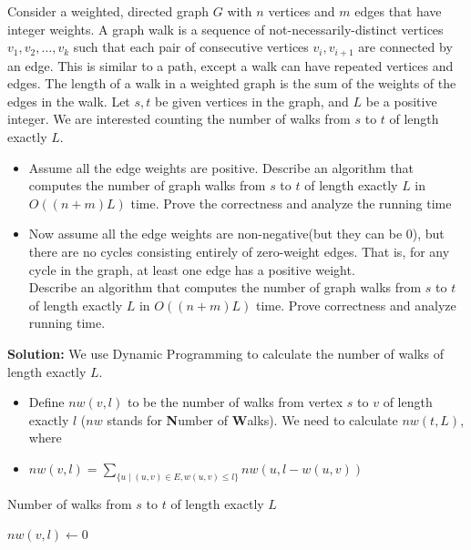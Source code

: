 \documentclass{article}
\newcounter{exercise}
\newcommand{\<}{
    \langle}
\renewcommand{\>}{
    \rangle}
\begin{document}
{\begin{exercise}
Consider a weighted, directed graph $G$ with $n$ vertices and $m$ edges that have integer weights. A graph walk is a sequence of
not-necessarily-distinct vertices $v_1,v_2,\ldots,v_k$ such that each pair of consecutive vertices $v_i,v_{i+1}$ are connected by an edge. This is similar to a path, except a walk can have repeated vertices and edges. The length of a walk in a weighted graph is the sum of the weights of the edges in the walk. Let $s,t$ be given vertices in the graph, and $L$ be a positive integer. We are interested counting the number of walks from $s$ to $t$ of length exactly $L$.
\begin{itemize}
\item Assume all the edge weights are positive. Describe an algorithm that computes the number of graph walks from $s$ to $t$ of length exactly $L$ in $O((n+m)L)$ time. Prove the correctness and analyze the running time
\item Now assume all the edge weights are non-negative(but they can be 0), but there are no cycles consisting entirely of zero-weight edges. That is, for any cycle in the graph, at least one edge has a positive weight.\\
Describe an algorithm that computes the number of graph walks from $s$ to $t$ of length exactly $L$ in $O((n+m)L)$ time. Prove correctness and analyze running time.
\end{itemize}
\end{exercise}

\textbf{Solution:} We use Dynamic Programming to calculate the number of walks of length exactly $L$. 
    \begin{itemize}
        \item Define $nw(v,l)$ to be the number of walks from vertex $s$ to $v$ of length exactly $l$ ($nw$ stands for \textbf{N}umber of \textbf{W}alks). We need to calculate $nw(t,L)$, where
        \item $nw(v,l)=\sum\limits_{\{u\mid (u,v)\in E,w(u,v)\leq l\}}nw(u,l-w(u,v))$
    \end{itemize}

\begin{algorithm}[htb]
    \label{algo:sss}
    \caption{Number of walks from $s$ to $t$ of length exactly $L$}
    \begin{algorithmic}[1]
        \label{algo:1}
                \State $nw(v,l)\leftarrow 0$
            \EndFor
        \EndFor
        

\end{algorithmic}
\end{algorithm}}
\end{document}
